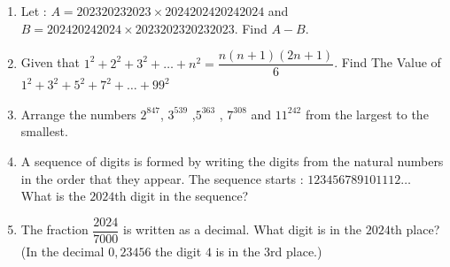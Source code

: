 \documentclass[11pt]{scrartcl}
\begin{document}
\begin{enumerate}
\item Let : $A = 202320232023 \times 2024202420242024$ and $B = 202420242024 \times 2023202320232023$. Find $A - B$.

\item Given that $1^2+2^2+3^2+\ldots+n^2=\dfrac{n(n+1)(2n+1)}{6}$. Find The Value of $1^2+3^2+5^2+7^2+\ldots+99^2$

\item Arrange the numbers $2^{847}$, $3^{539}$ ,$5^{363}$ , $7^{308}$ and $11^{242}$ from the largest to the smallest.

\item A sequence of digits is formed by writing the digits from the natural numbers in the order that they appear. The sequence starts : $123456789101112 \ldots$\\
What is the $2024$th digit in the sequence?

\item The fraction $\dfrac{2024}{7000}$ is written as a decimal. What digit is in the $2024$th place? (In the decimal $0,23456$ the digit $4$ is in the $3$rd place.)
\end{enumerate}
\end{document}
